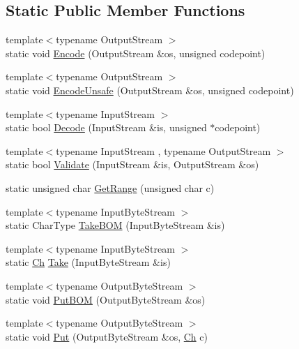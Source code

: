 \subsection*{Static Public Member Functions}
\begin{DoxyCompactItemize}
\item 
{\footnotesize template$<$typename Output\+Stream $>$ }\\static void \mbox{\hyperlink{structrapidjson_1_1_u_t_f8_ae7515b5a30ad9c565fe972e408b38135}{Encode}} (Output\+Stream \&os, unsigned codepoint)
\item 
{\footnotesize template$<$typename Output\+Stream $>$ }\\static void \mbox{\hyperlink{structrapidjson_1_1_u_t_f8_a2d4607f6c91a06881317382c31a7944d}{Encode\+Unsafe}} (Output\+Stream \&os, unsigned codepoint)
\item 
{\footnotesize template$<$typename Input\+Stream $>$ }\\static bool \mbox{\hyperlink{structrapidjson_1_1_u_t_f8_a6162dbaf07a21e06ae8e48c0186c9217}{Decode}} (Input\+Stream \&is, unsigned $\ast$codepoint)
\item 
{\footnotesize template$<$typename Input\+Stream , typename Output\+Stream $>$ }\\static bool \mbox{\hyperlink{structrapidjson_1_1_u_t_f8_a4bfabc54daeee1bdbfdbac3ec5f4392d}{Validate}} (Input\+Stream \&is, Output\+Stream \&os)
\item 
static unsigned char \mbox{\hyperlink{structrapidjson_1_1_u_t_f8_af3510e51d62eed8e64f5c162003d0c7e}{Get\+Range}} (unsigned char c)
\item 
{\footnotesize template$<$typename Input\+Byte\+Stream $>$ }\\static Char\+Type \mbox{\hyperlink{structrapidjson_1_1_u_t_f8_ab5d49ba5bb7948b1b38fdd6ea5fa026e}{Take\+B\+OM}} (Input\+Byte\+Stream \&is)
\item 
{\footnotesize template$<$typename Input\+Byte\+Stream $>$ }\\static \mbox{\hyperlink{structrapidjson_1_1_u_t_f8_a9f47e775d8306a647a5c9eceac4b52fc}{Ch}} \mbox{\hyperlink{structrapidjson_1_1_u_t_f8_ae940f0948417361aab47948b77aba3e3}{Take}} (Input\+Byte\+Stream \&is)
\item 
{\footnotesize template$<$typename Output\+Byte\+Stream $>$ }\\static void \mbox{\hyperlink{structrapidjson_1_1_u_t_f8_ac5843a8ff5370dd22d8ff631fef1d40e}{Put\+B\+OM}} (Output\+Byte\+Stream \&os)
\item 
{\footnotesize template$<$typename Output\+Byte\+Stream $>$ }\\static void \mbox{\hyperlink{structrapidjson_1_1_u_t_f8_a1bad7130f2c4af05880e92ea61a13aca}{Put}} (Output\+Byte\+Stream \&os, \mbox{\hyperlink{structrapidjson_1_1_u_t_f8_a9f47e775d8306a647a5c9eceac4b52fc}{Ch}} c)
\end{DoxyCompactItemize}


